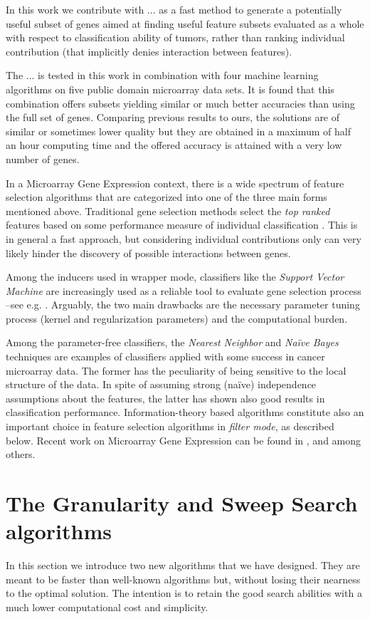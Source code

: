 \documentclass{article}
\begin{document}
In this work we contribute with ...
as a fast method to generate a potentially useful subset of genes aimed at finding useful feature subsets
evaluated as a whole with respect to classification ability of tumors,
rather than ranking individual contribution (that implicitly denies
interaction between features). 

The ... is tested in this work in combination with four machine
learning algorithms on five public domain microarray data sets. It is
found that this combination offers subsets yielding similar or much
better accuracies than using the full set of genes. Comparing previous
results to ours, the solutions are of similar or sometimes lower
quality but they are obtained in a maximum of half an hour computing
time and the offered accuracy is attained with a very low number of
genes.

In a Microarray Gene Expression context, there is a wide spectrum of
feature selection algorithms that are categorized into one of the three
main forms mentioned above. Traditional gene selection methods select
the \emph{top ranked} features based on some performance measure of
individual classification \cite{Rui05}. This is in general a fast
approach, but considering individual contributions only can very
likely hinder the discovery of possible interactions between genes.

Among the inducers used in wrapper mode, classifiers like the
\emph{Support Vector Machine} \cite{Vap98} are increasingly used as a
reliable tool to evaluate gene selection process --see e.g. 
\cite{Bo05, Tan07, Sat06, Chuf05}. Arguably, the two main 
drawbacks are the necessary parameter tuning process (kernel and
regularization parameters) and the computational burden.

Among the parameter-free classifiers, the \emph{Nearest Neighbor}
\cite{Th05} and \emph{Na\"ive Bayes} techniques \cite{To04} are
examples of classifiers applied with some success in cancer microarray
data.  The former has the peculiarity of being sensitive to the local
structure of the data. In spite of assuming strong (na\"ive)
independence assumptions about the features, the latter has shown also
good results in classification performance. Information-theory based
algorithms constitute also an important choice in feature selection
algorithms in \emph{filter mode}, as described below. Recent work on
Microarray Gene Expression can be found in \cite{Rui05},
\cite{Man05} and \cite{Lei04} among others.

\section{The Granularity and Sweep Search algorithms}
\label{section:Littles}
In this section we introduce two new algorithms that we have designed.
They are meant to be faster than well-known algorithms but, without losing their nearness to the optimal solution. The intention is to retain the good search abilities with a much lower computational cost and simplicity.
\end{document}
